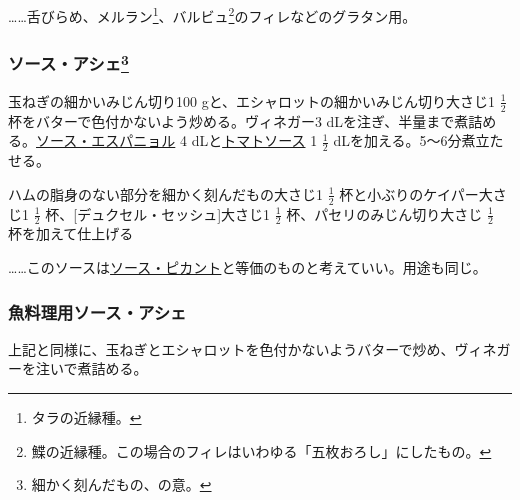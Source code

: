 \begin{recette}
\ldots{}\ldots{}舌びらめ、メルラン\footnote{タラの近縁種。}、バルビュ\footnote{鰈の近縁種。この場合のフィレはいわゆる「五枚おろし」にしたもの。}のフィレなどのグラタン用。

\atoaki{}

\hypertarget{sauce-hachee}{%
\subsubsection[ソース・アシェ]{\texorpdfstring{ソース・アシェ\footnote{細かく刻んだもの、の意。}}{ソース・アシェ}}\label{sauce-hachee}}


 

玉ねぎの細かいみじん切り100 gと、エシャロットの細かいみじん切り大さじ1
\(\frac{1}{2}\) 杯をバターで色付かないよう炒める。ヴィネガー3
dLを注ぎ、半量まで煮詰める。\protect\hyperlink{sauce-espagnole}{ソース・エスパニョル}
4 dLと\protect\hyperlink{sauce-tomate}{トマトソース} 1 \(\frac{1}{2}\)
dLを加える。5〜6分煮立たせる。

ハムの脂身のない部分を細かく刻んだもの大さじ1 \(\frac{1}{2}\)
杯と小ぶりのケイパー大さじ1 \(\frac{1}{2}\)
杯、{[}デュクセル・セッシュ{]}大さじ1 \(\frac{1}{2}\)
杯、パセリのみじん切り大さじ \(\frac{1}{2}\) 杯を加えて仕上げる

\ldots{}\ldots{}このソースは\protect\hyperlink{sauce-piquante}{ソース・ピカント}と等価のものと考えていい。用途も同じ。

\atoaki{}

\hypertarget{sauce-hachee-maigre}{%
\subsubsection{魚料理用ソース・アシェ}\label{sauce-hachee-maigre}}



上記と同様に、玉ねぎとエシャロットを色付かないようバターで炒め、ヴィネガーを注いで煮詰める。


\end{recette}
